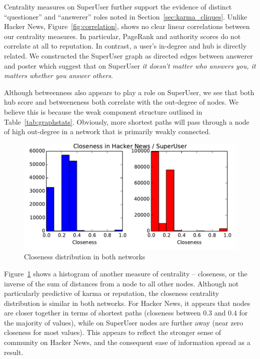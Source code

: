 \documentclass[11pt]{article}
\begin{document}
Centrality measures on SuperUser further support the evidence of distinct
``questioner'' and ``answerer'' roles noted in Section~\ref{sec:karma_cliques}.
Unlike Hacker News, Figure~\ref{fig:correlation}, shows no clear linear
correlations between our centrality measures. In particular, PageRank and
authority scores do not correlate at all to reputation. In contrast, a user's
in-degree and hub is directly related. We constructed the SuperUser graph as
directed edges between answerer and poster which suggest that on SuperUser
\textit{it doesn't matter who answers you, it matters whether you answer others}.

Although betweenness also appears to play a role on SuperUser, we see that
both hub score and betweeneness both correlate with the out-degree of nodes.
We believe this is because the weak component structure outlined in 
Table~\ref{tab:graphstats}. Obviously, more shortest paths will pass through a
node of high out-degree in a network that is primarily weakly connected.

\begin{figure}[h]
\centering
\includegraphics[width=\linewidth]{closeness}
\caption{Closeness distribution in both networks}
\label{fig:closeness}

\end{figure}

Figure~\ref{fig:closeness} shows a histogram of another measure of centrality --
closeness, or the inverse of the sum of distances from a node to all other
nodes.  Although not particularly predictive of karma or reputation, the
closeness centrality distribution is similar in both networks. For Hacker News,
it appears that nodes are closer together in terms of shortest paths (closeness
between $0.3$ and $0.4$ for the majority of values), while on SuperUser nodes
are further away (near zero closeness for most values). This appears to reflect
the stronger sense of community on Hacker News, and the consequent ease of
information spread as a result.
\end{document}
